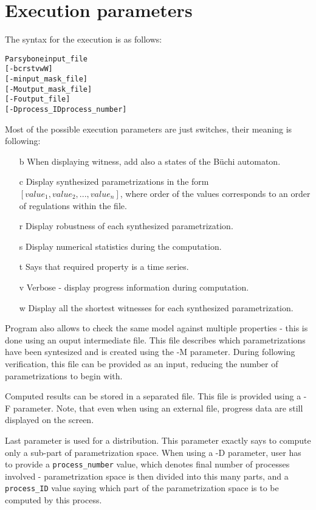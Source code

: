 \documentclass[12pt]{article}
\begin{document}
\section{Execution parameters}
The syntax for the execution is as follows:
\begin{alltt}
Parsybone input_file
          [-bcrstvwW]
          [-m input_mask_file]
          [-M output_mask_file]
          [-F output_file]
          [-D process_ID process_number]
\end{alltt}
Most of the possible execution parameters are just switches, their meaning is following:
\begin{itemize}
\item[b] When displaying witness, add also a states of the B\"uchi automaton.
\item[c] Display synthesized parametrizations in the form $[value_1, value_2,..., value_n]$, where order of the values corresponds to an order of regulations within the file.
\item[r] Display robustness of each synthesized parametrization.
\item[s] Display numerical statistics during the computation.
\item[t] Says that required property is a time series.
\item[v] Verbose - display progress information during computation.
\item[w] Display all the shortest witnesses for each synthesized parametrization.
\end{itemize}
Program also allows to check the same model against multiple properties - this is done using an ouput intermediate file. This file describes which parametrizations have been syntesized and is created using the -M parameter. During following verification, this file can be provided as an input, reducing the number of parametrizations to begin with.

Computed results can be stored in a separated file. This file is provided using a -F parameter. Note, that even when using an external file, progress data are still displayed on the screen.

Last parameter is used for a distribution. This parameter exactly says to compute only a sub-part of parametrization space. When using a -D parameter, user has to provide a \texttt{process\_number} value, which denotes final number of processes involved - parametrization space is then divided into this many parts, and a \texttt{process\_ID} value saying which part of the parametrization space is to be computed by this process.
\end{document}
